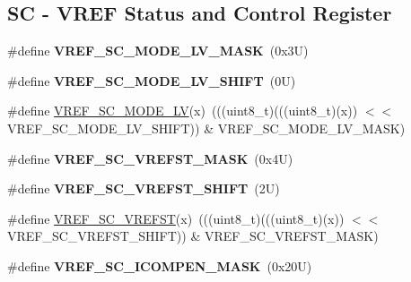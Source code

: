 \subsection*{SC -\/ V\+R\+EF Status and Control Register}
\begin{DoxyCompactItemize}
\item 
\mbox{\label{group___v_r_e_f___register___masks_ga7eb8ab4b25ed9f93b23d7199c50e7181}} 
\#define {\bfseries V\+R\+E\+F\+\_\+\+S\+C\+\_\+\+M\+O\+D\+E\+\_\+\+L\+V\+\_\+\+M\+A\+SK}~(0x3\+U)
\item 
\mbox{\label{group___v_r_e_f___register___masks_ga3130891ca865a042a784a2c3bc7141b0}} 
\#define {\bfseries V\+R\+E\+F\+\_\+\+S\+C\+\_\+\+M\+O\+D\+E\+\_\+\+L\+V\+\_\+\+S\+H\+I\+FT}~(0\+U)
\item 
\#define \mbox{\hyperlink{group___v_r_e_f___register___masks_ga2bd98e877f61a410c3226d6472365b5e}{V\+R\+E\+F\+\_\+\+S\+C\+\_\+\+M\+O\+D\+E\+\_\+\+LV}}(x)~(((uint8\+\_\+t)(((uint8\+\_\+t)(x)) $<$$<$ V\+R\+E\+F\+\_\+\+S\+C\+\_\+\+M\+O\+D\+E\+\_\+\+L\+V\+\_\+\+S\+H\+I\+FT)) \& V\+R\+E\+F\+\_\+\+S\+C\+\_\+\+M\+O\+D\+E\+\_\+\+L\+V\+\_\+\+M\+A\+SK)
\item 
\mbox{\label{group___v_r_e_f___register___masks_gadc4f84c737775ee82f350149ade8f5bf}} 
\#define {\bfseries V\+R\+E\+F\+\_\+\+S\+C\+\_\+\+V\+R\+E\+F\+S\+T\+\_\+\+M\+A\+SK}~(0x4\+U)
\item 
\mbox{\label{group___v_r_e_f___register___masks_ga88b36251362ceabbeeb2302dae65000d}} 
\#define {\bfseries V\+R\+E\+F\+\_\+\+S\+C\+\_\+\+V\+R\+E\+F\+S\+T\+\_\+\+S\+H\+I\+FT}~(2\+U)
\item 
\#define \mbox{\hyperlink{group___v_r_e_f___register___masks_ga30537740fce6d9a373359c63805e11e8}{V\+R\+E\+F\+\_\+\+S\+C\+\_\+\+V\+R\+E\+F\+ST}}(x)~(((uint8\+\_\+t)(((uint8\+\_\+t)(x)) $<$$<$ V\+R\+E\+F\+\_\+\+S\+C\+\_\+\+V\+R\+E\+F\+S\+T\+\_\+\+S\+H\+I\+FT)) \& V\+R\+E\+F\+\_\+\+S\+C\+\_\+\+V\+R\+E\+F\+S\+T\+\_\+\+M\+A\+SK)
\item 
\mbox{\label{group___v_r_e_f___register___masks_gaeb737c0b08409b6e7ea8de3bf7a90732}} 
\#define {\bfseries V\+R\+E\+F\+\_\+\+S\+C\+\_\+\+I\+C\+O\+M\+P\+E\+N\+\_\+\+M\+A\+SK}~(0x20\+U)

\end{DoxyCompactItemize}
